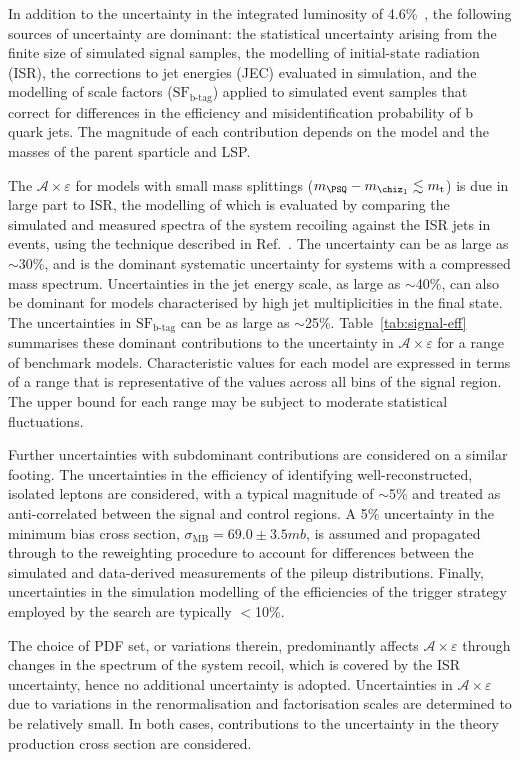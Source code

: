 In addition to the uncertainty in the integrated luminosity of
4.6\%~\cite{lumi}, the following sources of uncertainty are dominant:
the statistical uncertainty arising from the finite size of simulated
signal samples, the modelling of initial-state radiation (ISR), the
corrections to jet energies (JEC) evaluated in simulation, and the
modelling of scale factors ($\text{SF}_\text{b-tag}$) applied to
simulated event samples that correct for differences in the efficiency
and misidentification probability of b quark jets. The magnitude of
each contribution depends on the model and the masses of the parent
sparticle and LSP. 

The $\mathcal{A}\times\varepsilon$ for models with small mass
splittings (\eg $m_{\PSQ} - m_{\chiz_1} \lesssim m_{\text t}$) is due
in large part to ISR, the modelling of which is evaluated by comparing
the simulated and measured \Pt spectra of the system recoiling against
the ISR jets in \ttbar events, using the technique described in
Ref.~\cite{single-lepton-stop}. The uncertainty can be as large as
$\sim$30\%, and is the dominant systematic uncertainty for systems
with a compressed mass spectrum. Uncertainties in the jet energy
scale, as large as $\sim$40\%, can also be dominant for models
characterised by high jet multiplicities in the final state. The
uncertainties in $\text{SF}_\text{b-tag}$ can be as large as
$\sim$25\%. Table~\ref{tab:signal-eff} summarises these dominant
contributions to the uncertainty in $\mathcal{A}\times\varepsilon$ for
a range of benchmark models. Characteristic values for each model are
expressed in terms of a range that is representative of the values
across all bins of the signal region. The upper bound for each range
may be subject to moderate statistical fluctuations. 

Further uncertainties with subdominant contributions are considered on
a similar footing. The uncertainties in the efficiency of identifying
well-reconstructed, isolated leptons are considered, with a typical
magnitude of $\sim$5\% and treated as anti-correlated between the
signal and control regions. A 5\% uncertainty in the minimum bias
cross section, $\sigma_\text{MB} = 69.0 \pm 3.5\unit{mb}$, is assumed
and propagated through to the reweighting procedure to account for
differences between the simulated and data-derived measurements of the
pileup distributions. Finally, uncertainties in the simulation
modelling of the efficiencies of the trigger strategy employed by the
search are typically $<$10\%. 

The choice of PDF set, or variations therein, predominantly affects
$\mathcal{A}\times\varepsilon$ through changes in the \Pt spectrum of
the system recoil, which is covered by the ISR uncertainty, hence no
additional uncertainty is adopted. Uncertainties in
$\mathcal{A}\times\varepsilon$ due to variations in the
renormalisation and factorisation scales are determined to be
relatively small. In both cases, contributions to the uncertainty in
the theory production cross section are considered.

